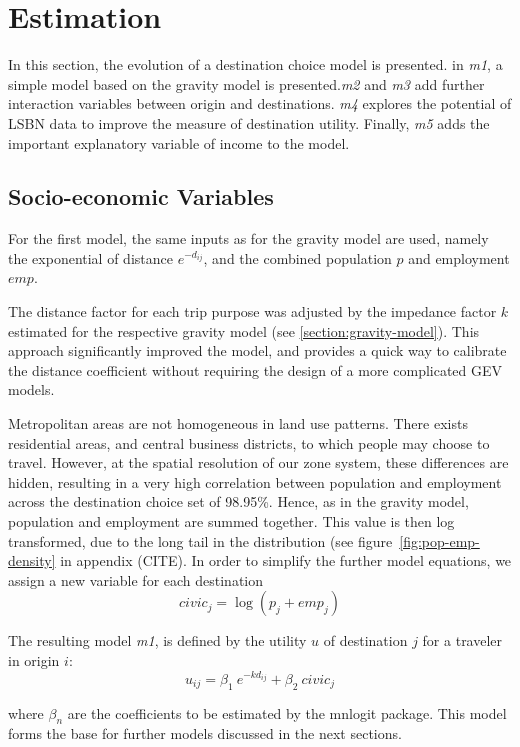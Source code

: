 \section{Estimation}
In this section, the evolution of a destination choice model is presented. in \textit{m1}, a simple model based on the gravity model is presented.\textit{m2} and \textit{m3} add further interaction variables between origin and destinations. \textit{m4} explores the potential of LSBN data to improve the measure of destination utility. Finally, \textit{m5} adds the important explanatory variable of income to the model.

\subsection{Socio-economic Variables}
For the first model, the same inputs as for the gravity model are used, namely the exponential of distance $e^{-d_{ij}}$, and the combined population $p$ and employment $emp$.

The distance factor for each trip purpose was adjusted by the impedance factor $k$ estimated for the respective gravity model (see \ref{section:gravity-model}). This approach significantly improved the model, and provides a quick way to calibrate the distance coefficient without requiring the design of a more complicated GEV models.

Metropolitan areas are not homogeneous in land use patterns. There exists residential areas, and central business districts, to which people may choose to travel. However, at the spatial resolution of our zone system, these differences are hidden, resulting in a very high correlation between population and employment across the destination choice set of 98.95\%. Hence, as in the gravity model, population and employment are summed together. This value is  then log transformed, due to the long tail in the distribution (see figure~\ref{fig:pop-emp-density} in appendix (CITE). In order to simplify the further model equations, we assign a new variable for each destination
$$ civic_j = \log\left( p_j + emp_j \right) $$

The resulting model \textit{m1}, is defined by the utility $u$ of destination $j$ for a traveler in origin $i$: 
$$ u_{ij} = \beta_1~e^{-k d_{ij}} + \beta_2~civic_j $$

where $\beta_n$ are the coefficients to be estimated by the mnlogit package. This model forms the base for further models discussed in the next sections. 

